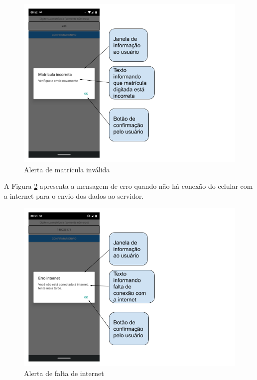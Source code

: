 \begin{figure}[H]
\centering
\caption{Alerta de matrícula inválida}
\includegraphics[scale=0.5]{figuras/estatisticas/matricula_incorreta.png}

\label{matricula_incorreta}
\end{figure}

A Figura \ref{sem_internet} apresenta a mensagem de erro quando não há conexão do celular com a internet para o envio dos dados ao servidor.

\begin{figure}[H]
\centering
\caption{Alerta de falta de internet}
\includegraphics[scale=0.5]{figuras/estatisticas/sem_internet.png}

\label{sem_internet}
\end{figure}

